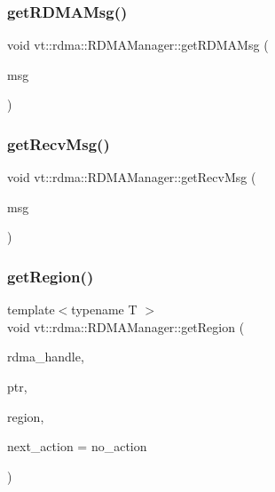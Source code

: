 \subsubsection{\texorpdfstring{get\+R\+D\+M\+A\+Msg()}{getRDMAMsg()}}
{\footnotesize\ttfamily void vt\+::rdma\+::\+R\+D\+M\+A\+Manager\+::get\+R\+D\+M\+A\+Msg (\begin{DoxyParamCaption}\item[{\hyperlink{namespacevt_1_1rdma_acce0da4c9ea1233c3f132c1971943653}{Get\+Message} $\ast$}]{msg }\end{DoxyParamCaption})\hspace{0.3cm}{\ttfamily [static]}}

\mbox{\label{structvt_1_1rdma_1_1_r_d_m_a_manager_a1c11e7b5616c22d03fd3884f99d3e7ff}} 
\subsubsection{\texorpdfstring{get\+Recv\+Msg()}{getRecvMsg()}}
{\footnotesize\ttfamily void vt\+::rdma\+::\+R\+D\+M\+A\+Manager\+::get\+Recv\+Msg (\begin{DoxyParamCaption}\item[{\hyperlink{namespacevt_1_1rdma_a72a94b92eba75ec9fec43b2a9a4ad878}{Get\+Back\+Message} $\ast$}]{msg }\end{DoxyParamCaption})\hspace{0.3cm}{\ttfamily [static]}}

\mbox{\label{structvt_1_1rdma_1_1_r_d_m_a_manager_a06506f3abad91d02456d88f4b1e4db1b}} 
\subsubsection{\texorpdfstring{get\+Region()}{getRegion()}}
{\footnotesize\ttfamily template$<$typename T $>$ \\
void vt\+::rdma\+::\+R\+D\+M\+A\+Manager\+::get\+Region (\begin{DoxyParamCaption}\item[{\hyperlink{namespacevt_a10442579ec4e7ebef223818e64bcf908}{R\+D\+M\+A\+\_\+\+Handle\+Type} const \&}]{rdma\+\_\+handle,  }\item[{T}]{ptr,  }\item[{\hyperlink{structvt_1_1rdma_1_1_r_d_m_a_manager_aafc574f533ebf5b34c1389ef504448bf}{R\+D\+M\+A\+\_\+\+Region\+Type} const \&}]{region,  }\item[{\hyperlink{namespacevt_ae0a5a7b18cc99d7b732cb4d44f46b0f3}{Action\+Type}}]{next\+\_\+action = {\ttfamily no\+\_\+action} }\end{DoxyParamCaption})\hspace{0.3cm}{\ttfamily [inline]}}

